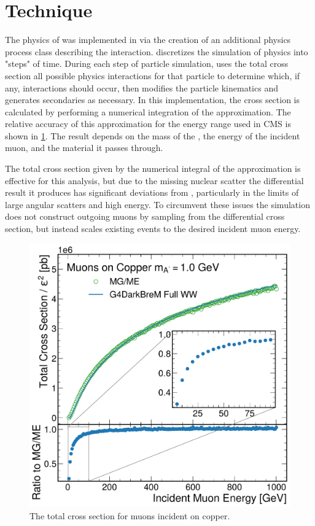 \section{Technique}
\label{sec:technique}

The physics of \dbrem was implemented in \gf via the creation of an additional physics process class describing the interaction. 
\gf discretizes the simulation of physics into "steps" of time. 
During each step of particle simulation, \gf uses the total cross section all possible physics interactions for that particle to determine which, if any, interactions should occur, then modifies the particle kinematics and generates secondaries as necessary. 
In this implementation, the cross section is calculated by performing a numerical integration of the \ww approximation.
The relative accuracy of this approximation for the energy range used in CMS is shown in \cref{fig:mu_xsec}.
The result depends on the mass of the \aprime,  the energy of the incident muon, and the material it passes through. 

The total cross section given by the numerical integral of the \ww approximation is effective for this analysis, but due to the missing nuclear scatter the differential result it produces has significant deviations from \mg, particularly in the limits of large angular scatters and high \aprime energy. 
To circumvent these issues the simulation does not construct outgoing muons by sampling from the differential \ww cross section, but instead scales existing \mg events to the desired incident muon energy. 

\begin{figure}[!htbp]
    \centering
    \includegraphics[width=\textwidth]{figures/mu_xsec.pdf}
    \caption[
        The \dbrem cross section.
    ]{
        The total \dbrem cross section for muons incident on copper. 
    }
    \label{fig:mu_xsec}
\end{figure}

